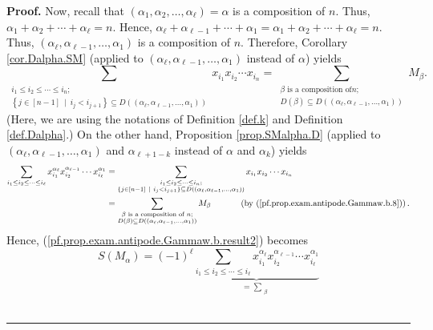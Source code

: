 \documentclass[numbers=enddot,12pt,final,onecolumn,notitlepage,abstracton]{scrartcl}
\theoremstyle{definition}
\newenvironment{proof}[1][Proof]{\noindent\textbf{#1.} }{\ \rule{0.5em}{0.5em}}
\let\sumnonlimits\sum
\renewcommand{\sum}{\sumnonlimits\limits}
\newenvironment{verlong}{}{}
\begin{document}
\begin{verlong}
\begin{footnotesize}
\begin{proof}
Now, recall that $\left(  \alpha_{1},\alpha_{2},\ldots,\alpha_{\ell}\right)
=\alpha$ is a composition of $n$. Thus, $\alpha_{1}+\alpha_{2}+\cdots
+\alpha_{\ell}=n$. Hence, $\alpha_{\ell}+\alpha_{\ell-1}+\cdots+\alpha
_{1}=\alpha_{1}+\alpha_{2}+\cdots+\alpha_{\ell}=n$. Thus, $\left(
\alpha_{\ell},\alpha_{\ell-1},\ldots,\alpha_{1}\right)  $ is a composition of
$n$. Therefore, Corollary \ref{cor.Dalpha.SM} (applied to $\left(
\alpha_{\ell},\alpha_{\ell-1},\ldots,\alpha_{1}\right)  $ instead of $\alpha$)
yields
\begin{equation}
\sum_{\substack{i_{1}\leq i_{2}\leq\cdots\leq i_{n};\\\left\{  j\in\left[
n-1\right]  \ \mid\ i_{j}<i_{j+1}\right\}  \subseteq D\left(  \left(
\alpha_{\ell},\alpha_{\ell-1},\ldots,\alpha_{1}\right)  \right)  }}x_{i_{1}%
}x_{i_{2}}\cdots x_{i_{n}}=\sum_{\substack{\beta\text{ is a composition of
}n;\\D\left(  \beta\right)  \subseteq D\left(  \left(  \alpha_{\ell}%
,\alpha_{\ell-1},\ldots,\alpha_{1}\right)  \right)  }}M_{\beta}.
\label{pf.prop.exam.antipode.Gammaw.b.8}%
\end{equation}
(Here, we are using the notations of Definition \ref{def.k} and Definition
\ref{def.Dalpha}.) On the other hand, Proposition \ref{prop.SMalpha.D}
(applied to $\left(  \alpha_{\ell},\alpha_{\ell-1},\ldots,\alpha_{1}\right)  $
and $\alpha_{\ell+1-k}$ instead of $\alpha$ and $\alpha_{k}$) yields%
\begin{align*}
\sum_{i_{1}\leq i_{2}\leq\cdots\leq i_{\ell}}x_{i_{1}}^{\alpha_{\ell}}%
x_{i_{2}}^{\alpha_{\ell-1}}\cdots x_{i_{\ell}}^{\alpha_{1}}  &  =\sum
_{\substack{i_{1}\leq i_{2}\leq\cdots\leq i_{n};\\\left\{  j\in\left[
n-1\right]  \ \mid\ i_{j}<i_{j+1}\right\}  \subseteq D\left(  \left(
\alpha_{\ell},\alpha_{\ell-1},\ldots,\alpha_{1}\right)  \right)  }}x_{i_{1}%
}x_{i_{2}}\cdots x_{i_{n}}\\
&  =\sum_{\substack{\beta\text{ is a composition of }n;\\D\left(
\beta\right)  \subseteq D\left(  \left(  \alpha_{\ell},\alpha_{\ell-1}%
,\ldots,\alpha_{1}\right)  \right)  }}M_{\beta}\ \ \ \ \ \ \ \ \ \ \left(
\text{by (\ref{pf.prop.exam.antipode.Gammaw.b.8})}\right)  .
\end{align*}
Hence, (\ref{pf.prop.exam.antipode.Gammaw.b.result2}) becomes%
\[
S\left(  M_{\alpha}\right)  =\left(  -1\right)  ^{\ell}\underbrace{\sum
_{i_{1}\leq i_{2}\leq\cdots\leq i_{\ell}}x_{i_{1}}^{\alpha_{\ell}}x_{i_{2}%
}^{\alpha_{\ell-1}}\cdots x_{i_{\ell}}^{\alpha_{1}}}_{=\sum_{\substack{\beta
}}}\]
\end{proof}
\end{footnotesize}
\end{verlong}
\end{document}
